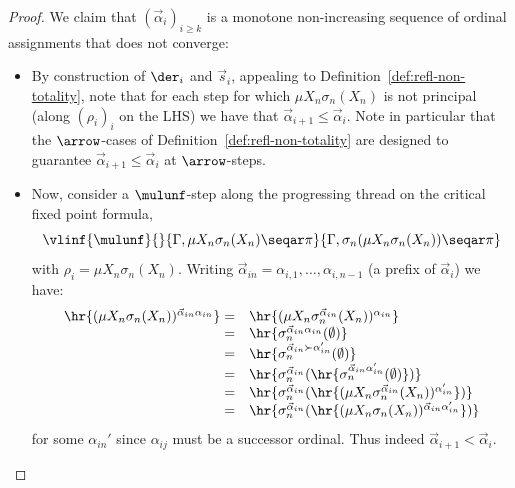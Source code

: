 \begin{proof}
We claim that $(\vec \alpha_i)_{i\geq k}$ is a monotone non-increasing sequence of ordinal assignments that does not converge:
\begin{itemize}
    \item By construction of $\der_i$ and $\vec s_i$, appealing to Definition~\ref{def:refl-non-totality}, note that for each step for which $\mu X_n\sigma_n(X_n)$ is not principal (along $(\rho_i)_i$ on the LHS) we have that $\vec \alpha_{i+1}\leq \vec \alpha_i$.
    Note in particular that the $\arrow$-cases of Definition~\ref{def:refl-non-totality} are designed to guarantee $\vec \alpha_{i+1}\leq \vec \alpha_i$ at $\arrow$-steps.
    \item Now, consider a $\mulunf$-step along the progressing thread on the critical fixed point formula,
    \[
    \vlinf{\mulunf}{}{\Gamma, \mu X_n \sigma_n(X_n)\seqar \pi}{\Gamma , \sigma_n(\mu X_n \sigma_n(X_n))\seqar \pi}
    \]
    with $\rho_i = \mu X_n \sigma_n (X_n)$.
    Writing $\vec \alpha_{in} = \alpha_{i,1}, \dots, \alpha_{i,n-1}$ (a prefix of $\vec \alpha_i$) we have:
    \[
    \begin{array}{rl}
        \hr{(\mu X_n \sigma_n (X_n))^{\vec \alpha_{in}\alpha_{in}}} 
        = & \hr{(\mu X_n \sigma_n^{\vec \alpha_{in}} (X_n))^{\alpha_{in}}} \\
        = & \hr{\sigma_n^{\vec \alpha_{in} \alpha_{in}}(\emptyset)} \\
        = & \hr{\sigma_n^{\vec \alpha_{in} \succ \alpha_{in}'}(\emptyset)} \\
        = & \hr{\sigma_n^{\vec \alpha_{in}} (\hr{\sigma_n^{\vec \alpha_{in} \alpha_{in}' } (\emptyset) } ) } \\
         = & \hr{\sigma_n^{\vec \alpha_{in}} (\hr{(\mu X_n \sigma_n^{\vec \alpha_{in}} (X_n))^{\alpha_{in}'}} ) } \\
           = & \hr{\sigma_n^{\vec \alpha_{in}} ( \hr{(\mu X_n \sigma_n(X_n))^{\vec \alpha_{in}\alpha_{in}'}}) } \\
    \end{array}
    \]
    for some $\alpha_{in}'$ since $\alpha_{ij}$ must be a successor ordinal.
    Thus indeed $\vec \alpha_{i+1} < \vec \alpha_{i}$.
\end{itemize}
% 

\end{proof}

